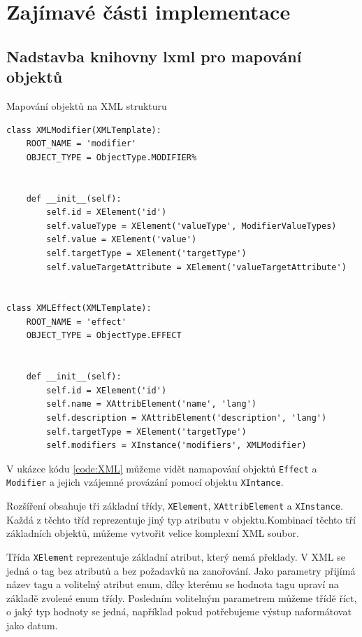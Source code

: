 \documentclass[thesis=B,czech]{resources/FITthesis}[2012/06/26]
\begin{document}
\section{Zajímavé části implementace}

	\subsection{Nadstavba knihovny lxml pro mapování objektů}
	\begin{listing}[htbp]
\caption{\label{code:XML}Mapování objektů na XML strukturu}
\begin{verbatim}
class XMLModifier(XMLTemplate):
    ROOT_NAME = 'modifier'
    OBJECT_TYPE = ObjectType.MODIFIER%


    def __init__(self):
        self.id = XElement('id')
        self.valueType = XElement('valueType', ModifierValueTypes)
        self.value = XElement('value')
        self.targetType = XElement('targetType')
        self.valueTargetAttribute = XElement('valueTargetAttribute')


class XMLEffect(XMLTemplate):
    ROOT_NAME = 'effect'
    OBJECT_TYPE = ObjectType.EFFECT


    def __init__(self):
        self.id = XElement('id')
        self.name = XAttribElement('name', 'lang')
        self.description = XAttribElement('description', 'lang')
        self.targetType = XElement('targetType')
        self.modifiers = XInstance('modifiers', XMLModifier)
\end{verbatim}
\end{listing}
	 V ukázce kódu  \ref{code:XML} můžeme vidět namapování objektů \texttt{Effect} a \texttt{Modifier} a jejich vzájemné provázání pomocí objektu \texttt{XIntance}. \par

Rozšíření obsahuje tři základní třídy, \texttt{XElement}, \texttt{XAttribElement} a \texttt{XInstance}. Každá z těchto tříd reprezentuje jiný typ atributu v objektu.Kombinací těchto tří základních objektů, můžeme vytvořit velice komplexní XML soubor. \par

Třída \texttt{XElement} reprezentuje základní atribut, který nemá překlady. V XML se jedná o tag bez atributů a bez požadavků na zanořování. Jako parametry přijímá název tagu a volitelný atribut enum, díky kterému se hodnota tagu upraví na základě zvolené enum třídy. Posledním volitelným parametrem můžeme třídě říct, o jaký typ hodnoty se jedná, například pokud potřebujeme výstup naformátovat jako datum. \par
\end{document}
